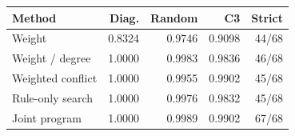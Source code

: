 \begin{tabular}{lrrrr}
\toprule
Method & Diag. & Random & C3 & Strict \\
\midrule
Weight & 0.8324 & 0.9746 & 0.9098 & 44/68 \\
Weight / degree & 1.0000 & 0.9983 & 0.9836 & 46/68 \\
Weighted conflict & 1.0000 & 0.9955 & 0.9902 & 45/68 \\
Rule-only search & 1.0000 & 0.9976 & 0.9832 & 45/68 \\
Joint program & 1.0000 & 0.9989 & 0.9902 & 67/68 \\
\bottomrule
\end{tabular}
